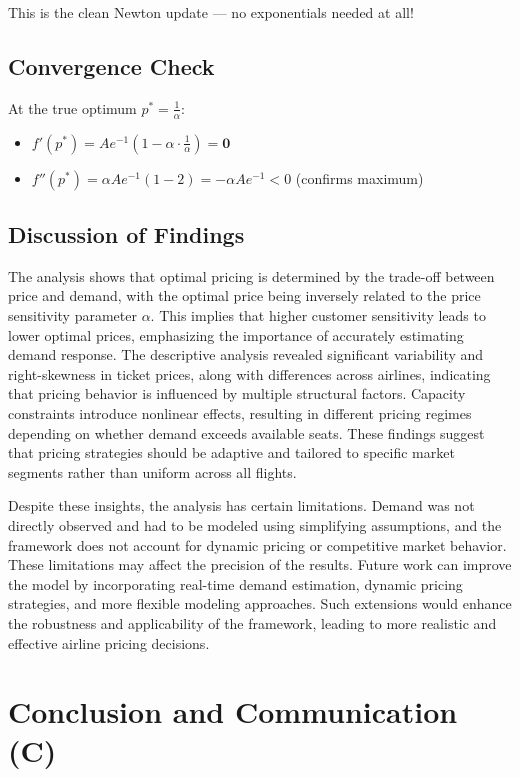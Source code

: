 \documentclass[12pt]{article}
\begin{document}
This is the clean Newton update — no exponentials needed at all!

\subsection*{Convergence Check}

At the true optimum $p^* = \frac{1}{\alpha}$:

\begin{itemize}
\item $f'(p^*) = Ae^{-1}(1 - \alpha \cdot \frac{1}{\alpha}) = \mathbf{0}$
\item $f''(p^*) = \alpha A e^{-1}(1 - 2) = -\alpha A e^{-1} < 0$ \quad (confirms maximum)
\end{itemize}

\subsection{Discussion of Findings}

The analysis shows that optimal pricing is determined by the trade-off between price and demand, with the optimal price being inversely related to the price sensitivity parameter $\alpha$. This implies that higher customer sensitivity leads to lower optimal prices, emphasizing the importance of accurately estimating demand response. The descriptive analysis revealed significant variability and right-skewness in ticket prices, along with differences across airlines, indicating that pricing behavior is influenced by multiple structural factors. Capacity constraints introduce nonlinear effects, resulting in different pricing regimes depending on whether demand exceeds available seats. These findings suggest that pricing strategies should be adaptive and tailored to specific market segments rather than uniform across all flights.

Despite these insights, the analysis has certain limitations. Demand was not directly observed and had to be modeled using simplifying assumptions, and the framework does not account for dynamic pricing or competitive market behavior. These limitations may affect the precision of the results. Future work can improve the model by incorporating real-time demand estimation, dynamic pricing strategies, and more flexible modeling approaches. Such extensions would enhance the robustness and applicability of the framework, leading to more realistic and effective airline pricing decisions.

\section{Conclusion and Communication (C)}
\end{document}
